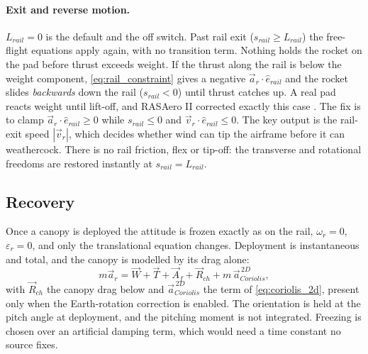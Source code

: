 \paragraph{Exit and reverse motion.} $L_{rail}=0$ is the default and the off switch. Past rail
exit ($s_{rail}\geq L_{rail}$) the free-flight equations apply again, with no transition term.
Nothing holds the rocket on the pad before thrust exceeds weight.
If the thrust along the rail is below the weight component, \autoref{eq:rail_constraint} gives a
negative $\vec{a}_r\cdot\hat{e}_{rail}$ and the rocket slides \emph{backwards} down the rail
($s_{rail}<0$) until thrust catches up. A real pad reacts weight until lift-off, and RASAero II
corrected exactly this case \cite{rasaerorel}. The fix is to clamp $\vec{a}_r\cdot\hat{e}_{rail}\geq0$
while $s_{rail}\leq0$ and $\vec{v}_r\cdot\hat{e}_{rail}\leq0$.
The key output is the rail-exit speed $|\vec{v}_r|$, which decides whether wind can tip the
airframe before it can weathercock. There is no rail friction, flex or tip-off: the transverse and
rotational freedoms are restored instantly at $s_{rail}=L_{rail}$.

\subsection{Recovery}\label{sec:recovery}
Once a canopy is deployed the attitude is frozen exactly as on the rail, $\omega_r=0$,
$\varepsilon_r=0$, and only the translational equation changes. Deployment is instantaneous and
total, and the canopy is modelled by its drag alone:
\begin{equation} \label{eq:chute_eom}
    m\vec{a}_r = \vec{W} + \vec{T} + \vec{A}_f + \vec{R}_{ch} + m\,\vec{a}_{Coriolis}^{\,2D},
\end{equation}
with $\vec{R}_{ch}$ the canopy drag below and $\vec{a}_{Coriolis}^{\,2D}$ the term of
\autoref{eq:coriolis_2d}, present only when the Earth-rotation correction is enabled. The
orientation is held at the pitch angle at deployment, and the pitching moment is not integrated.
Freezing is chosen over an artificial damping term, which would need a time constant no source
fixes.

